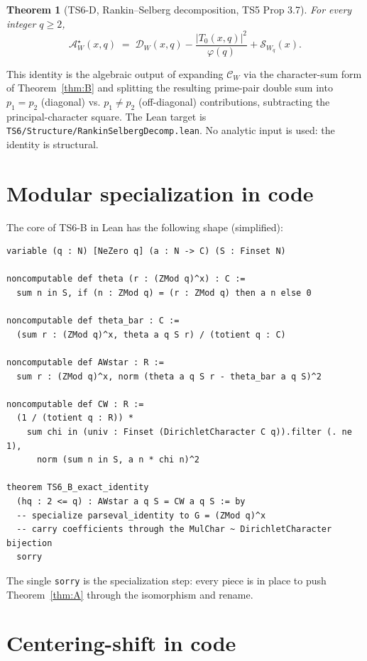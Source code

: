 \documentclass[11pt,a4paper]{article}
\newtheorem{theorem}{Theorem}[section]
\newcommand{\AWs}{\mathcal{A}_W^\star}
\newcommand{\CW}{\mathcal{C}_W}
\newcommand{\DW}{\mathcal{D}_W}
\newcommand{\SW}{\mathcal{S}_W}
\newcommand{\bphi}{\varphi}
\begin{document}
\begin{theorem}[TS6-D, Rankin--Selberg decomposition, TS5 Prop 3.7]
\label{thm:D}
For every integer $q \ge 2$,
\[
\AWs(x, q) \;=\; \DW(x, q) - \frac{|T_{0}(x, q)|^{2}}{\bphi(q)}
  + \SW_{q}(x).
\]
\end{theorem}

This identity is the algebraic output of expanding $\CW$ via the
character-sum form of Theorem~\ref{thm:B} and splitting the resulting
prime-pair double sum into $p_{1} = p_{2}$ (diagonal) vs.
$p_{1} \ne p_{2}$ (off-diagonal) contributions, subtracting the
principal-character square. The Lean target is
\texttt{TS6/Structure/RankinSelbergDecomp.lean}. No analytic input is
used: the identity is structural.

\section{Modular specialization in code}\label{sec:modular}

The core of TS6-B in Lean has the following shape (simplified):

\begin{lstlisting}
variable (q : N) [NeZero q] (a : N -> C) (S : Finset N)

noncomputable def theta (r : (ZMod q)^x) : C :=
  sum n in S, if (n : ZMod q) = (r : ZMod q) then a n else 0

noncomputable def theta_bar : C :=
  (sum r : (ZMod q)^x, theta a q S r) / (totient q : C)

noncomputable def AWstar : R :=
  sum r : (ZMod q)^x, norm (theta a q S r - theta_bar a q S)^2

noncomputable def CW : R :=
  (1 / (totient q : R)) *
    sum chi in (univ : Finset (DirichletCharacter C q)).filter (. ne 1),
      norm (sum n in S, a n * chi n)^2

theorem TS6_B_exact_identity
  (hq : 2 <= q) : AWstar a q S = CW a q S := by
  -- specialize parseval_identity to G = (ZMod q)^x
  -- carry coefficients through the MulChar ~ DirichletCharacter bijection
  sorry
\end{lstlisting}

The single \texttt{sorry} is the specialization step: every piece is in
place to push Theorem~\ref{thm:A} through the isomorphism and rename.

\section{Centering-shift in code}\label{sec:shift}
\end{document}
